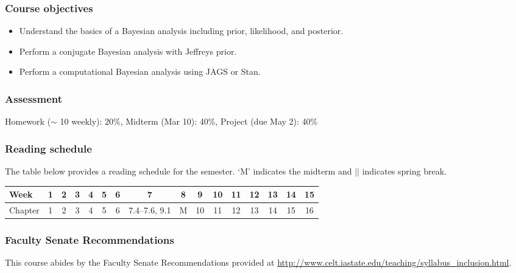 \documentclass[12pt]{article}
\begin{document}
\subsubsection*{Course objectives}
\begin{itemize}
\item Understand the basics of a Bayesian analysis including prior, likelihood, and posterior. 
\item Perform a conjugate Bayesian analysis with Jeffreys prior.
\item Perform a computational Bayesian analysis using JAGS or Stan.
\end{itemize}

\subsubsection*{Assessment}

Homework ($\sim$ 10 weekly): 20\%, Midterm (Mar 10): 40\%, Project (due May 2): 40\%

\subsubsection*{Reading schedule}

The table below provides a reading schedule for the semester. `M' indicates the midterm and $\vert\vert$ indicates spring break. 

\vspace{0.2in} 

\begin{tabular}{|l|cccccccc||ccccccc|}
\hline
Week & 1 & 2 & 3 & 4 & 5 & 6 & 7 & 8 & 9 & 10 & 11 & 12 & 13 & 14 & 15 \\
\hline
Chapter & 1 & 2  & 3 & 4 & 5 & 6 & 7.4--7.6, 9.1 & M & 10 & 11 & 12 & 13 & 14 & 15 & 16\\
\hline
\end{tabular}

\subsubsection*{Faculty Senate Recommendations}

This course abides by the Faculty Senate Recommendations provided at \url{http://www.celt.iastate.edu/teaching/syllabus_inclusion.html}.
\end{document}

